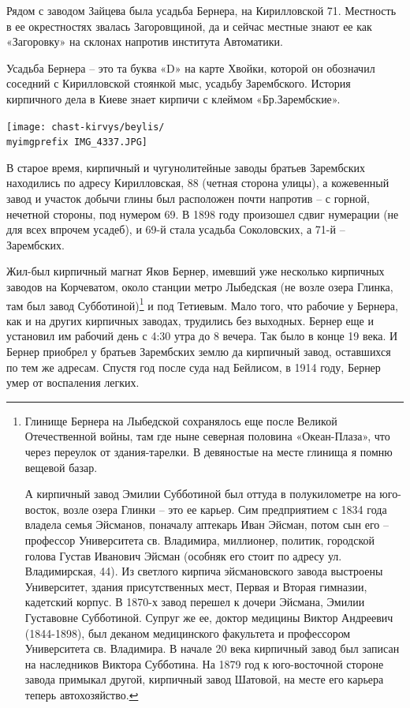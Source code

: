 Рядом с заводом Зайцева была усадьба Бернера, на Кирилловской 71. Местность в ее окрестностях звалась Загоровщиной, да и сейчас местные знают ее как «Загоровку» на склонах напротив института Автоматики.

Усадьба Бернера – это та буква «D» на карте Хвойки, которой он обозначил соседний с Кирилловской стоянкой мыс, усадьбу Зарембского. История кирпичного дела в Киеве знает кирпичи с клеймом «Бр.Зарембские».

\begin{center}
\texttt{[image: chast-kirvys/beylis/\\myimgprefix IMG\_4337.JPG]}
\end{center}

В старое время, кирпичный и чугунолитейные заводы братьев Зарембских находились по адресу Кирилловская, 88 (четная сторона улицы), а кожевенный завод и участок добычи глины был расположен почти напротив – с горной, нечетной стороны, под нумером 69. В 1898 году произошел сдвиг нумерации (не для всех впрочем усадеб), и 69-й стала усадьба Соколовских, а 71-й – Зарембских.

Жил-был кирпичный магнат Яков Бернер, имевший уже несколько кирпичных заводов на Корчеватом, около станции метро Лыбедская (не возле озера Глинка, там был завод Субботиной)\footnote{Глинище Бернера на Лыбедской сохранялось еще после Великой Отечественной войны, там где ныне северная половина «Океан-Плаза», что через переулок от здания-тарелки. В девяностые на месте глинища я помню вещевой базар. 

А кирпичный завод Эмилии Субботиной был оттуда в полукилометре на юго-восток, возле озера Глинки – это ее карьер. Сим предприятием с 1834 года владела семья Эйсманов, поначалу аптекарь Иван Эйсман, потом сын его – профессор Университета св. Владимира, миллионер, политик, городской голова Густав Иванович Эйсман (особняк его стоит по адресу ул. Владимирская, 44). Из светлого кирпича эйсмановского завода выстроены Университет, здания присутственных мест, Первая и Вторая гимназии, кадетский корпус. В 1870-х завод перешел к дочери Эйсмана, Эмилии Густавовне Субботиной. Супруг же ее, доктор медицины Виктор Андреевич (1844-1898), был деканом медицинского факультета и профессором Университета св. Владимира. В начале 20 века кирпичный завод был записан на наследников Виктора Субботина. На 1879 год к юго-восточной стороне завода примыкал другой, кирпичный завод Шатовой, на месте его карьера теперь автохозяйство.} и под Тетиевым. Мало того, что рабочие у Бернера, как и на других кирпичных заводах, трудились без выходных. Бернер еще и установил им рабочий день с 4:30 утра до 8 вечера. Так было в конце 19 века. И Бернер приобрел у братьев Зарембских землю да кирпичный завод, оставшихся по тем же адресам. Спустя год после суда над Бейлисом, в 1914 году, Бернер умер от воспаления легких.

